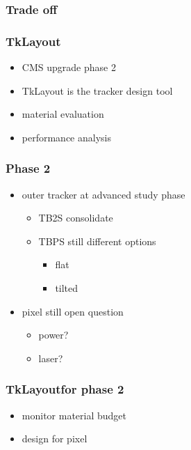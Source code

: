 \documentclass[pdftex, 11pt]{beamer}
\newcommand{\tkl}{TkLayout}
\begin{document}
\begin{frame}[fragile]
  \frametitle{Trade off}
  \begin{center}
  \end{center}
\end{frame}

\begin{frame}
  \frametitle{\tkl}
  \begin{itemize}
  \item CMS upgrade \alert{phase 2}
  \item \alert{\tkl} is the tracker design tool
  \item \alert{material} evaluation
  \item \alert{performance} analysis
  \end{itemize}
\end{frame}

\begin{frame}
  \frametitle{Phase 2}
  \begin{itemize}
  \item \alert{outer tracker} at advanced study phase
    \begin{itemize}
    \item \alert{TB2S} consolidate
    \item \alert{TBPS} still different options
      \begin{itemize}
      \item \alert{flat}
      \item \alert{tilted}
      \end{itemize}
    \end{itemize}
  \item \alert{pixel} still open question
    \begin{itemize}
    \item power?
    \item laser?
    \end{itemize}
  \end{itemize}
\end{frame}

\begin{frame}
  \frametitle{\tkl for phase 2}
  \begin{itemize}
  \item \alert{monitor} material budget
  \item \alert{design} for pixel
  \end{itemize}
\end{frame}
\end{document}
